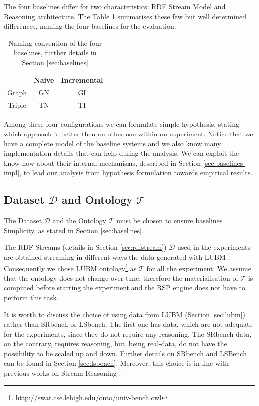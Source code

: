 The four baselines differ for two characteristics: RDF Stream Model and Reasoning architecture. The Table \ref{tab:baselines-names} summarises these few but well determined differences, naming the four baselines for the evaluation:\begin{table}[htb]
\scriptsize
\centering
\begin{tabular}{c|cc} %
	\hline
         & Naive & Incremental\\
	\hline
	Graph        &  GN      & GI\\
	Triple   &  TN   & TI\\
	\hline %
\end{tabular}
\caption{Naming convention of the four baselines, further details in Section \ref{sec:baselines}}
\label{tab:baselines-names}
\end{table}

\noindent Among these four configurations we can formulate simple hypothesis, stating which approach is better then an other one within an experiment. Notice that we have a complete model of the baseline systems and we also know many implementation details that can help during the analysis. We can exploit the know-how about their internal mechanisms, described in Section \ref{sec:baselines-impl}, to lead our analysis from hypothesis formulation towards empirical results. 

\subsection{Dataset $\mathcal{D}$ and Ontology $\mathcal{T}$}\label{sec:dataset}

\noindent The Dataset  $\mathcal{D}$ and the Ontology $\mathcal{T}$ must be chosen to ensure baselines Simplicity, as stated in Section \ref{sec:baselines}. 

The RDF Streams (details in Section \ref{sec:rdfstream}) $\mathcal{D}$ used in the experiments are obtained streaming in different ways the data generated with LUBM  \cite{Guo2005}. Consequently we chose LUBM ontology\footnote{http://swat.cse.lehigh.edu/onto/univ-bench.owl} as $\mathcal{T}$ for all the experiment. We assume that the ontology does not change over time, therefore the materialisation of $\mathcal{T}$ is computed before starting the experiment and the RSP engine does not have to perform this task. 

It is worth to discuss the choice of using data from LUBM (Section \ref{sec:lubm}) rather than SRbench or LSbench. The first one has data, which are not adequate for the experiments, since they do not require any reasoning. The SRbench data, on the contrary, requires reasoning, but, being real-data, do not have the possibility to be scaled up and down. Further details on SRbench and LSBench can be found in Section \ref{sec:lsbench}. Moreover, this choice is in line with previous works on Stream Reasoning \cite{DBLP:conf/semweb/UrbaniMJHB13}. 

